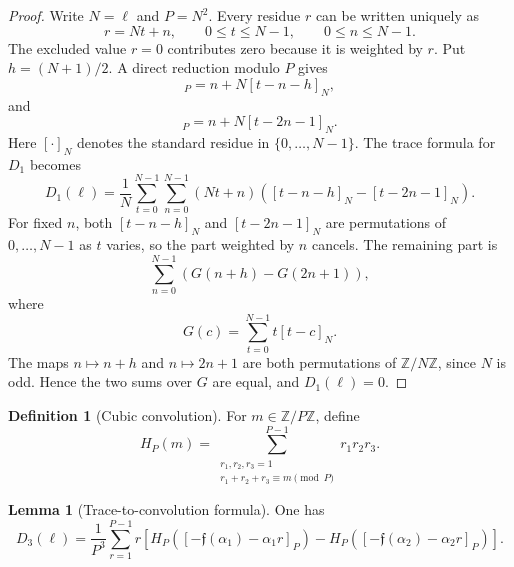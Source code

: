 \documentclass{article}
\theoremstyle{definition}
\newtheorem{lemma}[theorem]{Lemma}
\newtheorem{definition}[theorem]{Definition}
\numberwithin{equation}{section}
\begin{document}
\begin{proof}
Write $N=\ell$ and $P=N^2$.  Every residue $r$ can be written uniquely as
\begin{equation}
r=Nt+n,
\qquad
0\leq t\leq N-1,
\qquad
0\leq n\leq N-1.
\end{equation}
The excluded value $r=0$ contributes zero because it is weighted by $r$.  Put $h=(N+1)/2$.  A direct reduction modulo $P$ gives
\begin{equation}
[-\mathfrak e(\alpha_1)-\alpha_1 r]_P=n+N[t-n-h]_N,
\end{equation}
and
\begin{equation}
[-\mathfrak e(\alpha_2)-\alpha_2 r]_P=n+N[t-2n-1]_N.
\end{equation}
Here $[\cdot]_N$ denotes the standard residue in $\{0,\ldots,N-1\}$.  The trace formula for $D_1$ becomes
\begin{equation}
D_1(\ell)=\frac1N\sum_{t=0}^{N-1}\sum_{n=0}^{N-1}(Nt+n)\left([t-n-h]_N-[t-2n-1]_N\right).
\end{equation}
For fixed $n$, both $[t-n-h]_N$ and $[t-2n-1]_N$ are permutations of $0,
\ldots,N-1$ as $t$ varies, so the part weighted by $n$ cancels.  The remaining part is
\begin{equation}
\sum_{n=0}^{N-1}\left(G(n+h)-G(2n+1)\right),
\end{equation}
where
\begin{equation}
G(c)=\sum_{t=0}^{N-1}t[t-c]_N.
\end{equation}
The maps $n\mapsto n+h$ and $n\mapsto2n+1$ are both permutations of $\mathbb Z/N\mathbb Z$, since $N$ is odd.  Hence the two sums over $G$ are equal, and $D_1(\ell)=0$.
\end{proof}

\begin{definition}[Cubic convolution]
For $m\in\mathbb Z/P\mathbb Z$, define
\begin{equation}
H_P(m)=\sum_{\substack{r_1,r_2,r_3=1\\r_1+r_2+r_3\equiv m\!\!\!\pmod P}}^{P-1}r_1r_2r_3.
\end{equation}
\end{definition}

\begin{lemma}[Trace-to-convolution formula]
\label{lem:D3-trace-to-convolution}
One has
\begin{equation}
D_3(\ell)=\frac1{P^3}\sum_{r=1}^{P-1}r\left[H_P([-\mathfrak f(\alpha_1)-\alpha_1 r]_P)-H_P([-\mathfrak f(\alpha_2)-\alpha_2 r]_P)\right].
\end{equation}
\end{lemma}
\end{document}
